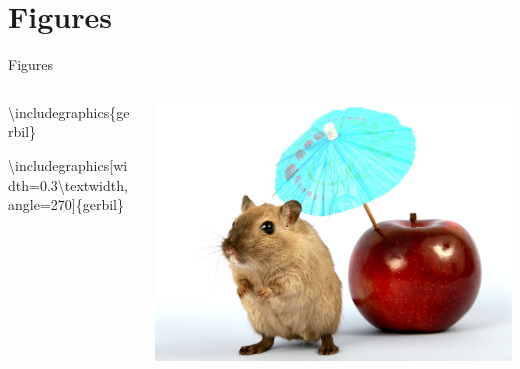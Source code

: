 \documentclass[,aspectratio=43]{beamer}
\newcommand{\VERB}{\Verb[commandchars=\\\{\}]}
\newenvironment{Shaded}{\begin{snugshade}}{\end{snugshade}}
\newcommand{\BuiltInTok}[1]{#1}
\newcommand{\ExtensionTok}[1]{#1}
\newcommand{\FunctionTok}[1]{\textcolor[rgb]{0.02,0.16,0.49}{#1}}
\newcommand{\NormalTok}[1]{#1}
\begin{document}
\hypertarget{figures}{%
\section{Figures}\label{figures}}

\begin{frame}[fragile]{Figures}

\begin{columns}[T]
\begin{column}{0.68\textwidth}
\small
\vspace{-1em}

\begin{Shaded}
\begin{Highlighting}[]
\BuiltInTok{\textbackslash{}includegraphics}\NormalTok{\{}\ExtensionTok{gerbil}\NormalTok{\}}





\BuiltInTok{\textbackslash{}includegraphics}\NormalTok{[width=0.3}\FunctionTok{\textbackslash{}textwidth}\NormalTok{,}
\NormalTok{                 angle=270]\{}\ExtensionTok{gerbil}\NormalTok{\}}
                 
                 
\end{Highlighting}
\end{Shaded}
\end{column}

\begin{column}{0.28\textwidth}
\includegraphics[width=\textwidth]{figure/gerbil}


\end{column}
\end{columns}
\end{frame}
\end{document}
